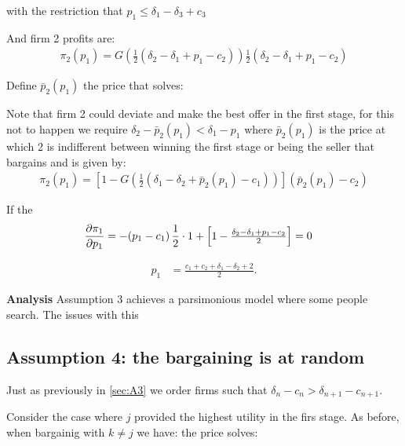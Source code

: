 \documentclass[12pt]{article}
\theoremstyle{plain}
\theoremstyle{plain}
\begin{document}
with the restriction that $p_1 \leq \delta_1 - \delta_3+c_3$

And firm 2 profits are: 
\begin{align}
    \pi_2(p_1) = G\left(\frac{1}{2}(\delta_{2} - \delta_1 + p_1 - c_{2})\right) \frac{1}{2}(\delta_2 - \delta_1 + p_1 - c_2)
\end{align}

Define $\bar{p}_2(p_1)$ the price that solves: 

Note that firm 2 could deviate and make the best offer in the first stage, for this not to happen we require $\delta_2 - \bar{p}_2(p_1)<\delta_1 -p_1$ where $ \bar{p}_2(p_1)$ is the price at which 2 is indifferent between winning the first stage or being the seller that bargains and is given by: 
\begin{align}
    \pi_2(p_1) =  \left[ 1-G\left(\frac{1}{2}(\delta_{1} - \delta_2 + \bar{p}_2(p_1) - c_{1}) \right)\right](\bar{p}_2(p_1) -c_2)
\end{align}
 




\vspace{3cm}
If the 
\begin{align}
\frac{\partial \pi_1}{\partial p_1}
&= -(p_1 - c_1)\,\frac{1}{2}\cdot 1
  + \Bigl[1 - \tfrac{\delta_2 - \delta_1 + p_1 - c_2}{2}\Bigr]
  = 0
\end{align}

\begin{align}
p_1 &= \frac{c_1 + c_2 + \delta_1 - \delta_2 + 2}{2}.
\end{align}




\vspace{3cm}


\textbf{Analysis}
Assumption 3 achieves a parsimonious model where some people search. The issues with this 



\vspace{3cm}
\subsection*{Assumption 4: the bargaining is at random}

Just as previously in \ref{sec:A3} we order firms such that $\delta_n - c_n>\delta_{n+1} - c_{n+1}$.


Consider the case where $j$ provided the highest utility in the firs stage. As before, when bargainig with $ k \neq j$ we have: the price solves: 
\end{document}
